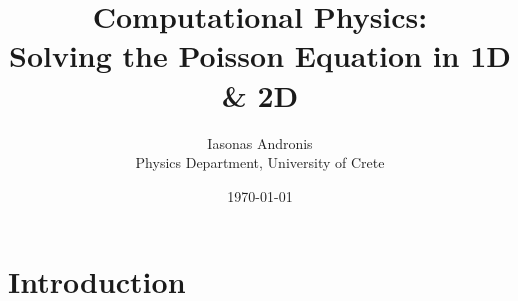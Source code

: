 \documentclass[12pt,a4paper]{article}
\title{\textbf{Computational Physics:\\ Solving the Poisson Equation in 1D \& 2D}}
\date{\today}
\author{Iasonas Andronis\\ Physics Department, University of Crete}
\begin{document}
\vspace{5mm}
\maketitle
\section{Introduction}
\blindtext
\end{document}
